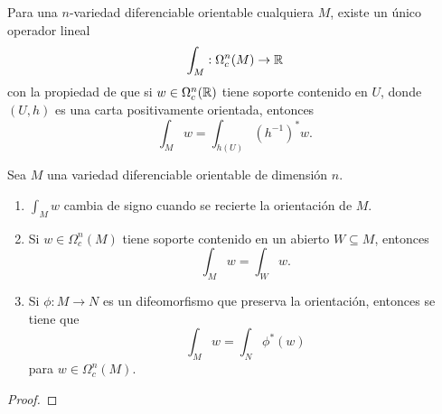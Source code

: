 \documentclass[CV.tex]{subfiles}
\begin{document}
\begin{prop}
Para una $n$-variedad diferenciable orientable cualquiera $M$, existe un único operador lineal 
\[
\int_M:\Omega_c^n(M)\to\mathbb{R}
\]
con la propiedad de que si $w\in\Omega_c^n(\mathbb{R})$ tiene soporte contenido en $U$, donde $(U,h)$ es una carta positivamente orientada, entonces
\[
\int_M w=\int_{h(U)}(h^{-1})^*w.
\]
\end{prop}
\begin{dem}
\QED
\end{dem}
\begin{lemma}
Sea $M$ una variedad diferenciable orientable de dimensión $n$.
\begin{enumerate}
\item  $\int_M w$ cambia de signo cuando se recierte la orientación de $M$.
\item Si $w\in \Omega_c^n(M)$ tiene soporte contenido en un abierto $W\subseteq M$, entonces
\[
\int_M w=\int_W w.
\]
\item Si $\phi:M\to N$ es un difeomorfismo que preserva la orientación, entonces se tiene que
\[
\int_M w=\int_N\phi^*(w)
\]
para $w\in\Omega_c^n(M)$. 
\end{enumerate}
\end{lemma}
\begin{proof}

\end{proof}
\end{document}
